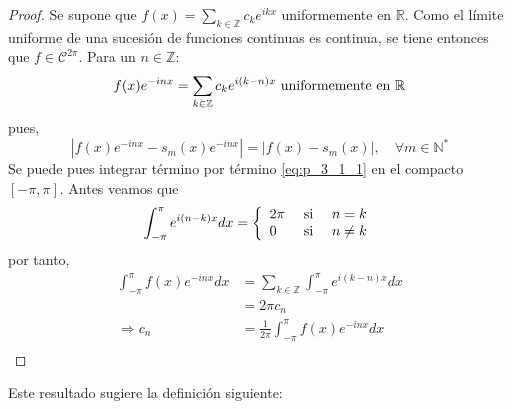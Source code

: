 \documentclass[12pt]{report}
\theoremstyle{largebreak}
\newcommand\abs[1]{\ensuremath{\left|#1\right|}}
\begin{document}
    \begin{proof}
        Se supone que $f(x)=\sum_{k\in\mathbb{Z}}c_k e^{ ikx}$ uniformemente en $\mathbb{R}$. Como el límite uniforme de una sucesión de funciones continuas es continua, se tiene entonces que $f\in\mathcal{C}^{2\pi}$. Para un $n\in\mathbb{Z}$:
        \begin{equation}
            \begin{split}
                f(x)e^{ -inx}=\sum_{k\in\mathbb{Z}}c_k e^{ i(k-n)x}\textup{ uniformemente en }\mathbb{R}
            \end{split}
            \label{eq:p_3_1_1}
        \end{equation}
        pues,
        \begin{equation*}
            \abs{f(x)e^{ -inx}-s_m(x)e^{-inx}}=\abs{f(x)-s_m(x)},\quad\forall m\in\mathbb{N}^*
        \end{equation*}
        Se puede pues integrar término por término \ref{eq:p_3_1_1} en el compacto $[-\pi,\pi]$. Antes veamos que
        \begin{equation*}
            \begin{split}
                \int_{ -\pi}^{\pi}e^{ i(n-k)x}dx=\left\{
                    \begin{array}[pos]{lcr}
                        2\pi & \textup{ si } & n=k\\
                        0 & \textup{ si } & n\neq k\\
                    \end{array}
                \right.
            \end{split}
        \end{equation*}
        por tanto,
        \begin{equation*}
            \begin{split}
                \int_{-\pi}^\pi f(x)e^{ -inx}dx&=\sum_{ k\in\mathbb{Z}}\int_{-\pi}^\pi e^{ i(k-n)x}dx\\
                &= 2\pi c_n\\
                \Rightarrow c_n&=\frac{1}{2\pi}\int_{-\pi}^\pi f(x)e^{ -inx}dx\\
            \end{split}
        \end{equation*}
    \end{proof}
    
    Este resultado sugiere la definición siguiente:
\end{document}
